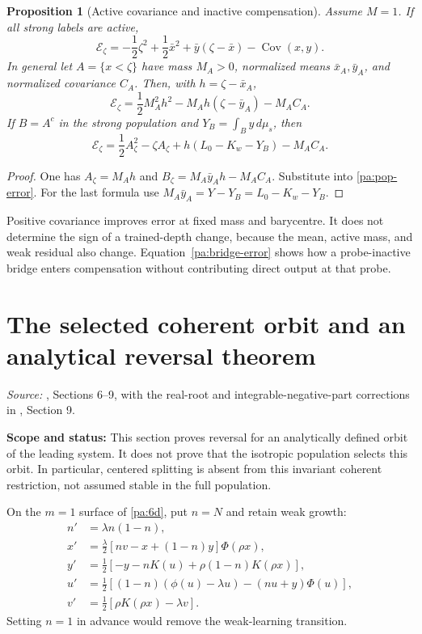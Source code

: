 \documentclass[11pt]{article}
\numberwithin{equation}{section}
\newtheorem{proposition}{Proposition}[section]
\theoremstyle{definition}
\theoremstyle{remark}
\newcommand{\1}{\mathbf 1}
\newcommand{\dd}{\,d}
\DeclareMathOperator{\Cov}{Cov}
\newcommand{\scope}[1]{\par\noindent\textbf{Scope and status:} #1\par\smallskip}
\newcommand{\source}[1]{\par\noindent\textit{Source:} #1\par\smallskip}
\begin{document}
\begin{proposition}[Active covariance and inactive compensation]\label{pa:active-error}
Assume $M=1$. If all strong labels are active,
\[
 \mathcal E_\zeta=-\frac12\zeta^2+\frac12\bar x^2
 +\bar y(\zeta-\bar x)-\Cov(x,y).
\]
In general let $A=\{x<\zeta\}$ have mass $M_A>0$, normalized means
$\bar x_A,\bar y_A$, and normalized covariance $C_A$. Then, with
$h=\zeta-\bar x_A$,
\begin{equation}\label{pa:partial-error}
 \mathcal E_\zeta=\frac12M_A^2h^2
 -M_Ah(\zeta-\bar y_A)-M_AC_A.
\end{equation}
If $B=A^c$ in the strong population and $Y_B=\int_B y\dd\mu_s$, then
\begin{equation}\label{pa:bridge-error}
 \mathcal E_\zeta=\frac12A_\zeta^2-\zeta A_\zeta
 +h(L_0-K_w-Y_B)-M_AC_A.
\end{equation}
\end{proposition}
\begin{proof}
One has $A_\zeta=M_Ah$ and
$B_\zeta=M_A\bar y_Ah-M_AC_A$. Substitute into
\eqref{pa:pop-error}. For the last formula use
$M_A\bar y_A=Y-Y_B=L_0-K_w-Y_B$.
\end{proof}
Positive covariance improves error at fixed mass and barycentre. It does
not determine the sign of a trained-depth change, because the mean,
active mass, and weak residual also change. Equation~\eqref{pa:bridge-error}
shows how a probe-inactive bridge enters compensation without contributing
direct output at that probe.

\section{The selected coherent orbit and an analytical reversal theorem}
\label{pa:orbit}
\source{\cite{TN}, Sections 6--9, with the real-root and integrable-negative-part
corrections in \cite{SP}, Section 9.}
\scope{This section proves reversal for an analytically defined orbit of the
leading system. It does not prove that the isotropic population selects this
orbit. In particular, centered splitting is absent from this invariant
coherent restriction, not assumed stable in the full population.}

On the $m=1$ surface of \eqref{pa:6d}, put $n=N$ and retain weak growth:
\begin{align}
 n'&=\lambda n(1-n),\label{pa:5d}\\
 x'&=\tfrac\lambda2[nv-x+(1-n)y]\Phi(\rho x),\nonumber\\
 y'&=\tfrac12[-y-nK(u)+\rho(1-n)K(\rho x)],\nonumber\\
 u'&=\tfrac12[(1-n)(\phi(u)-\lambda u)-(nu+y)\Phi(u)],\nonumber\\
 v'&=\tfrac12[\rho K(\rho x)-\lambda v].\nonumber
\end{align}
Setting $n=1$ in advance would remove the weak-learning transition.
\end{document}
